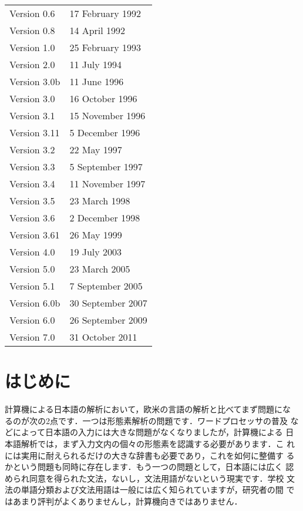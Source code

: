 \documentclass[a4j,titlepage]{jarticle}
\begin{document}
\begin{small}
\begin{tabular}{ll}
Version 0.6 & 17 February 1992 \\
Version 0.8 & 14 April 1992 \\
Version 1.0 & 25 February 1993 \\
Version 2.0 & 11 July 1994 \\
Version 3.0b & 11 June 1996 \\
Version 3.0 & 16 October 1996 \\
Version 3.1 & 15 November 1996 \\
Version 3.11 & 5 December 1996 \\
Version 3.2 & 22 May 1997 \\
Version 3.3 & 5 September 1997 \\
Version 3.4 & 11 November 1997 \\
Version 3.5 & 23 March 1998 \\
Version 3.6 & 2 December 1998 \\
Version 3.61 & 26 May 1999 \\
Version 4.0 & 19 July 2003 \\
Version 5.0 & 23 March 2005 \\
Version 5.1 & 7 September 2005 \\
Version 6.0b & 30 September 2007 \\
Version 6.0 & 26 September 2009 \\
Version 7.0 & 31 October 2011 \\
\end{tabular}
\end{small}

\clearpage

\tableofcontents

\clearpage
{}

\section{はじめに}

計算機による日本語の解析において，欧米の言語の解析と比べてまず問題にな
るのが次の2点です．一つは形態素解析の問題です．ワードプロセッサの普及
などによって日本語の入力には大きな問題がなくなりましたが，計算機による
日本語解析では，まず入力文内の個々の形態素を認識する必要があります．こ
れには実用に耐えられるだけの大きな辞書も必要であり，これを如何に整備す
るかという問題も同時に存在します．もう一つの問題として，日本語には広く
認められ同意を得られた文法，ないし，文法用語がないという現実です．学校
文法の単語分類および文法用語は一般には広く知られていますが，研究者の間
ではあまり評判がよくありませんし，計算機向きではありません．
\end{document}
